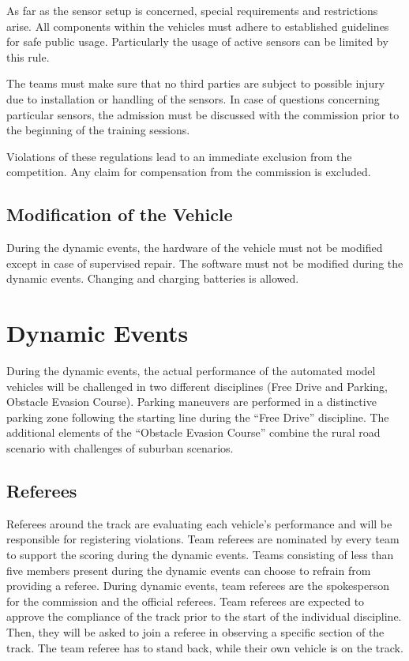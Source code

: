 \documentclass[a4paper]{report}
\begin{document}
As far as the sensor setup is concerned, special requirements and restrictions arise. All components within the vehicles must adhere to established guidelines for safe public usage. Particularly the usage of active sensors can be limited by this rule. 

The teams must make sure that no third parties are subject to possible injury due to installation or handling of the sensors. In case of questions concerning particular sensors, the admission must be discussed with the commission prior to the beginning of the training sessions. 

Violations of these regulations lead to an immediate exclusion from the competition. Any claim for compensation from the commission is excluded. 

\section{Modification of the Vehicle}

During the dynamic events, the hardware of the vehicle must not be modified except in case of supervised repair. The software must not be modified during the dynamic events. Changing and charging batteries is allowed. 

\chapter{Dynamic Events}

During the dynamic events, the actual performance of the automated model vehicles will be challenged in two different disciplines (Free Drive and Parking, Obstacle Evasion Course). Parking maneuvers are performed in a distinctive parking zone following the starting line during the “Free Drive” discipline. The additional elements of the “Obstacle Evasion Course” combine the rural road scenario with challenges of suburban scenarios. 

\section{Referees}

Referees around the track are evaluating each vehicle’s performance and will be responsible for registering violations. Team referees are nominated by every team to support the scoring during the dynamic events. Teams consisting of less than five members present during the dynamic events can choose to refrain from providing a referee. During dynamic events, team referees are the spokesperson for the commission and the official referees. Team referees are expected to approve the compliance of the track prior to the start of the individual discipline. Then, they will be asked to join a referee in observing a specific section of the track. The team referee has to stand back, while their own vehicle is on the track. 
\end{document}
